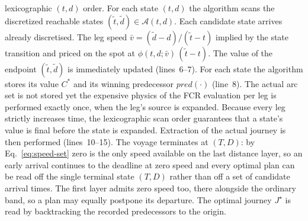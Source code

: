 \documentclass[review,authoryear]{elsarticle}
\begin{document}
lexicographic $(t,d)$ order.
For each state $(t,d)$  the algorithm scans the discretized reachable states $(\tilde t, \tilde d)  \in \mathcal{A}(t,d)$.
Each candidate state arrives already discretised. The leg speed
$\bar v=(\tilde d-d)/(\tilde t-t)$ implied by the state transition and priced on the spot at $\phi(t,d;\bar v)\,(\tilde t-t)$. The value of the endpoint $(\tilde t, \tilde d)$ is
immediately updated  (lines~6--7). For each state the algorithm stores its value $C^{*}$ and its winning predecessor
$pred(\cdot)$ (line~8). The actual arc set is not stored yet the expensive physics of the FCR evaluation per leg is performed exactly once, when the leg's source
is expanded. Because every leg strictly increases time, the lexicographic scan order guarantees that
a state's value is final before the state is expanded.
Extraction of the actual journey is then performed (lines~10--15).  The voyage terminates at $(T,D)$: by
Eq.~\eqref{eq:speed-set} zero is the only speed available on the last distance layer, so an early
arrival continues to the deadline at zero speed and every optimal plan can be read off the single
terminal state $(T,D)$ rather than off a set of candidate arrival times. The first layer admits zero
speed too, there alongside the ordinary band, so a plan may equally postpone its departure. The
optimal journey $J^{\star}$ is read by backtracking the recorded predecessors to the origin.
\end{document}
